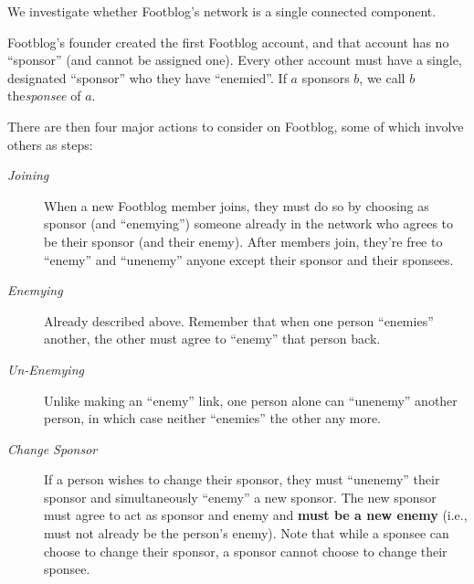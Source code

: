 \documentclass[11pt, oneside]{article}   	%
\theoremstyle{definition}
\theoremstyle{remark}
\begin{document}
We investigate whether Footblog's network is a single connected
component.

Footblog's founder created the first Footblog account, and that
account has no ``sponsor'' (and cannot be assigned one). Every other account must have a single, designated ``sponsor'' who they have ``enemied''. If $a$ sponsors $b$, we call $b$ the\emph{sponsee} of $a$.

There are then four major actions to consider on Footblog, some of which involve others as steps:
\begin{description}
	\item[\emph{Joining}] When a new Footblog member joins, they must do so by
               choosing as sponsor (and ``enemying'') someone already in
               the network who agrees to be their sponsor (and their
               enemy). After members join, they're free to ``enemy''
               and ``unenemy'' anyone except their sponsor and their
               sponsees.
	\item[\emph{Enemying}] Already described above. Remember that when one person
                ``enemies'' another, the other must agree to ``enemy''
                that person back.
	\item[\emph{Un-Enemying}] Unlike making an ``enemy'' link, one person alone can
                   ``unenemy'' another person, in which case neither
                   ``enemies'' the other any more.
	\item[\emph{Change Sponsor}] If a person wishes to change their sponsor, they
     must ``unenemy'' their sponsor and simultaneously ``enemy'' a new
     sponsor. The new sponsor must agree to act as sponsor and enemy
     and \textbf{must be a new enemy} (i.e., must not already be the person's
     enemy). Note that while a sponsee can choose to change their
     sponsor, a sponsor cannot choose to change their sponsee.
\end{description}
\end{document}
